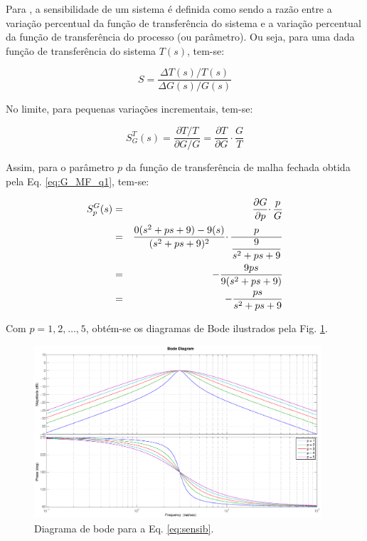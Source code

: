 Para , a sensibilidade de um sistema é definida como sendo
a razão entre a variação percentual da função de transferência do sistema e a
variação percentual da função de transferência do processo (ou parâmetro). Ou
seja, para uma dada função de transferência do sistema $T(s)$, tem-se:

\begin{equation}
S = \frac{\Delta T(s)/T(s)}{\Delta G(s)/G(s)}
\end{equation}

No limite, para pequenas variações incrementais, tem-se:

\begin{equation}
S_G^T(s) = \frac{\partial T / T}{ \partial G / G} 
         = \frac{\partial T}{\partial G} \cdotp \frac{G}{T}
\end{equation}

Assim, para o parâmetro $p$ da função de transferência de malha fechada
obtida pela Eq. \ref{eq:G_MF_q1}, tem-se:

\begin{eqnarray}
S_p^G(s) & = & \frac{\partial G}{\partial p} \cdotp \frac{p}{G}\nonumber \\
         & = & \frac{0(s^2 + ps + 9) - 9(s)}{(s^2 + ps + 9)^2} \cdotp
               \frac{p}{\displaystyle\frac{9}{s^2 + ps + 9}}\nonumber\\
         & = & - \frac{9ps}{9(s^2 + ps + 9)}\nonumber\\
         & = & - \frac{ps}{s^2 + ps + 9}\label{eq:sensib}
\end{eqnarray}

Com $p = 1\text{,}\ 2\text{,}\ \ldots\text{,}\ 5$, obtém-se os diagramas de Bode
ilustrados pela Fig. \ref{fig:diag_bode_sensib}.

\begin{figure}[htb]
\centering
    \includegraphics[width=0.95\textwidth]{imgs/questao1/bode_sensib}
    \caption{Diagrama de bode para a Eq. \ref{eq:sensib}.}
    \label{fig:diag_bode_sensib}
\end{figure}

